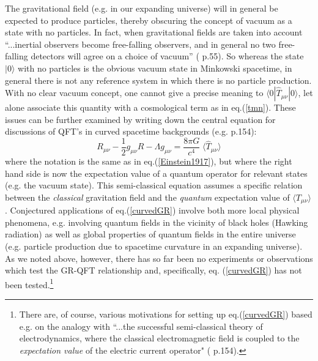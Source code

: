 \documentclass[12pt]{article}
\newcommand{\beq}{\begin{equation}}
\newcommand{\eeq}{\end{equation}}
\begin{document}
The gravitational field (e.g. in our expanding universe) will in
general be expected to produce particles, thereby obscuring the
concept of vacuum as a state with no particles. In fact, when
gravitational fields are taken into account ``...inertial
observers become free-falling observers, and in general no two
free-falling detectors will agree on a choice of vacuum''
(\cite{birrell82} p.55). So whereas the state $|0 \rangle $ with no
particles is the obvious vacuum state in Minkowski spacetime, in
general there is not any reference system in which there is no
particle production. With no clear vacuum concept, one cannot give
a precise meaning to $\langle 0|\hat{T}_{\mu\nu}|0 \rangle $, let alone associate
this quantity with a cosmological term as in eq.(\ref{tmn}). 
These issues can be further examined by writing down the central
equation for discussions of QFT's in curved spacetime backgrounds
(e.g. \cite{birrell82} p.154):
\beq
\label{curvedGR}
R_{\mu \nu} - \frac{1}{2} g_{\mu \nu} R -
\Lambda g_{\mu \nu} =  \frac{8 \pi G}{c^4} \; \langle\hat{T}_{\mu \nu}\rangle
\eeq
where the notation is the same as in eq.(\ref{Einstein1917}), but
where the right hand side is now the expectation value of a
quantum operator for relevant states (e.g. the vacuum state). This
semi-classical equation assumes a specific relation between the
{\em classical} gravitation field and the {\em quantum}
expectation value of $\langle T_{\mu\nu} \rangle $. Conjectured applications of
eq.(\ref{curvedGR}) involve both more local physical phenomena,
e.g. involving quantum fields in the vicinity of black holes
(Hawking radiation) as well as global properties of quantum fields
in the entire universe (e.g. particle production due to spacetime
curvature in an expanding universe). As we noted above, however,
there has so far been no experiments or observations which test
the GR-QFT relationship and, specifically, eq. (\ref{curvedGR}) has
not been tested.\footnote{There are, of course, various motivations
for setting up eq.(\ref{curvedGR}) based e.g. on the analogy with
``...the successful semi-classical theory of electrodynamics, where
the classical electromagnetic field is coupled to the {\em expectation
value} of the electric current operator" (\cite{birrell82} p.154).} 
\end{document}
